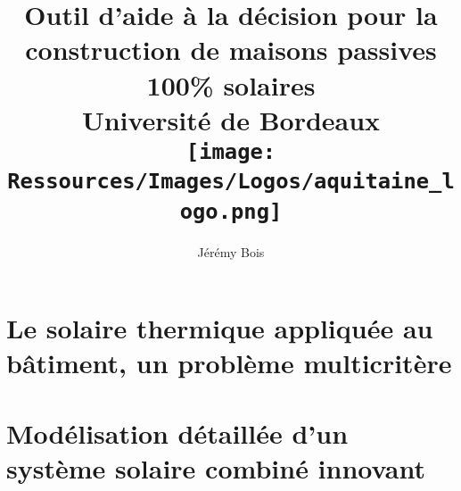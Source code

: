 \documentclass[11pt, oneside, fixOverflow]{JeremyThesis}
\title{
    {Outil d’aide à la décision pour la construction de maisons passives 100\% solaires}\\
    {\large Université de Bordeaux}\\
    {\texttt{[image: Ressources/Images/Logos/aquitaine\_logo.png]}}
}
\author{Jérémy Bois}
\date{}
\begin{document}
\begin{titlepage}
    \maketitle
    \thispagestyle{empty}
\end{titlepage}




\tableofcontents
\listoffigures
\listoftables
\listofalgorithms
% 
\thispagestyle{empty}
\newpage
\listoftodos[Notes]
\newpage


% 

\chapter{Le solaire thermique appliquée au bâtiment, un problème multicritère}
% 

\chapter{Modélisation détaillée d’un système solaire combiné innovant}
% 
\end{document}

